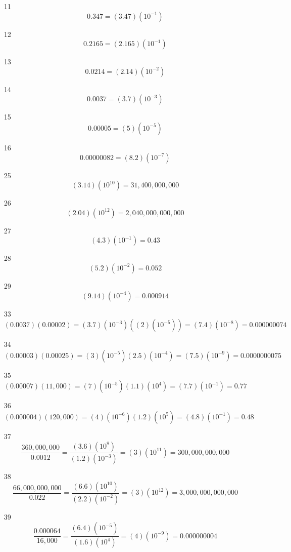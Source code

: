 \documentclass[fleqn,addpoints]{exam}
\begin{document}
\begin{itemize}
\item[11]
\[
  0.347 = (3.47)(10^{-1})
\]

\item[12]
\[
  0.2165 = (2.165)(10^{-1})
\]

\item[13]
\[
  0.0214 = (2.14)(10^{-2})
\]

\item[14]
\[
  0.0037 = (3.7)(10^{-3})
\]

\item[15]
\[
  0.00005 = (5)(10^{-5})
\]

\item[16]
\[
  0.00000082 = (8.2)(10^{-7})
\]

\item[25]
\[
  (3.14)(10^{10}) = 31,400,000,000
\]

\item[26]
\[
  (2.04)(10^{12}) = 2,040,000,000,000
\]

\item[27]
\[
  (4.3)(10^{-1}) = 0.43
\]

\item[28]
\[
  (5.2)(10^{-2}) = 0.052
\]

\item[29]
\[
  (9.14)(10^{-4}) = 0.000914
\]

\item[33]
\[
  (0.0037)(0.00002) = (3.7)(10^{-3})((2)(10^{-5})) = (7.4)(10^{-8}) = 0.000000074
\]

\item[34]
\[
  (0.00003)(0.00025) = (3)(10^{-5})(2.5)(10^{-4}) = (7.5)(10^{-9}) = 0.0000000075
\]

\item[35]
\[
  (0.00007)(11,000) = (7)(10^{-5})(1.1)(10^{4}) = (7.7)(10^{-1}) = 0.77
\]

\item[36]
\[
  (0.000004)(120,000) = (4)(10^{-6})(1.2)(10^{5}) = (4.8)(10^{-1}) = 0.48
\]

\item[37]
\[
  \frac{360,000,000}{0.0012} = \frac{(3.6)(10^8)}{(1.2)(10^{-3})} = (3)(10^{11}) = 300,000,000,000
\]

\item[38]
\[
  \frac{66,000,000,000}{0.022} = \frac{(6.6)(10^{10})}{(2.2)(10^{-2})} = (3)(10^{12}) = 3,000,000,000,000
\]

\item[39]
\[
  \frac{0.000064}{16,000} = \frac{(6.4)(10^{-5})}{(1.6)(10^{4})} = (4)(10^{-9}) = 0.000000004
\]


\end{itemize}
\end{document}

